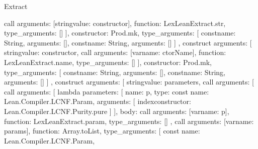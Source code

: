 \begin{lexlean}{Extract}
\begin{toolingmodule}
{{{{{{{                        call{
                          arguments: [string{value: constructor}],
                          function: LexLeanExtract.str,
                          type_arguments: []
                        }
                      ],
                      constructor: Prod.mk,
                      type_arguments: [
                        const{name: String, arguments: []},
                        const{name: String, arguments: []}
                      ]
                    },
                    construct{
                      arguments: [
                        string{value: constructor},
                        call{
                          arguments: [var{name: ctorName}],
                          function: LexLeanExtract.name,
                          type_arguments: []
                        }
                      ],
                      constructor: Prod.mk,
                      type_arguments: [
                        const{name: String, arguments: []},
                        const{name: String, arguments: []}
                      ]
                    },
                    construct{
                      arguments: [
                        string{value: parameters},
                        call{
                          arguments: [
                            call{
                              arguments: [
                                lambda{
                                  parameters: [
                                    {
                                      name: p,
                                      type: const{
                                        name: Lean.Compiler.LCNF.Param,
                                        arguments: [
                                          index{constructor: Lean.Compiler.LCNF.Purity.pure}
                                        ]
                                      }
                                    }
                                  ],
                                  body: call{
                                    arguments: [var{name: p}],
                                    function: LexLeanExtract.param,
                                    type_arguments: []
                                  }
                                },
                                call{
                                  arguments: [var{name: params}],
                                  function: Array.toList,
                                  type_arguments: [
                                    const{
                                      name: Lean.Compiler.LCNF.Param,
}}}}}}}}}}}
\end{toolingmodule}
\end{lexlean}
